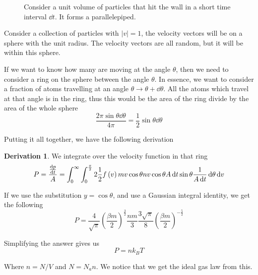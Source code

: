 \documentclass[12pt,chapterprefix=false,dvipsnames]{scrbook}
\theoremstyle{dotless}
\theoremstyle{definition}
\newtheorem{protoderivation}{Derivation}[section]
\newenvironment{derivation}
{\colorlet{shadecolor}{purple!15}\begin{shaded}\begin{protoderivation}}
			{\end{protoderivation}\end{shaded}}
\begin{document}
\begin{figure}[htpb]
	\centering
	
	\caption{Consider a unit volume of particles that hit the wall in a short
		time interval $\dd{t}$. It forms a parallelepiped.}%
	\label{fig:pressure_distribution}
\end{figure}

Consider a collection of particles with $\left|v\right| = 1$,
the velocity vectors will be on a sphere with the unit radius.
The velocity vectors are all random, but it will be within this
sphere.

If we want to know how many are moving at the angle
$\theta$, then we need to consider a ring on the
sphere between the angle $\theta$. In essence, we
want to consider a fraction of atoms travelling at an angle
$\theta \rightarrow \theta +\dd{\theta}$. All the atoms which travel at that
angle is in the ring, thus this would be the area of the ring
divide by the area of the whole sphere
\begin{equation}
	\frac{2\pi\sin{\theta}\dd{\theta}}{4\pi}
	=
	\frac{1}{2}\sin{\theta}\dd{\theta}
\end{equation}

Putting it all together, we have the following derivation

\begin{derivation}
	We integrate over the velocity function in that ring
	\begin{equation}
		P = \frac{\dv{p}{t}}{A} =
		\int_0^\infty\int_0^{\frac{\pi}{2}}2\frac{1}{2}
		f\left(v\right) mv\cos{\theta}
		nv\cos{\theta} A
		\dd{t}\sin{\theta}
		\frac{1}{A \dd{t}}
		\dd{\theta}\dd{v}
	\end{equation}

	If we use the substitution $y = \cos{\theta}$, and use a
	Gaussian integral identity, we get the following
	\begin{equation}
		P = \frac{4}{\sqrt{\pi}} {\left(\frac{\beta m}{2}\right)}^{\frac{3}{2}} \frac{nm}{3}
		\frac{3\sqrt{\pi}}{8} {\left(\frac{\beta m}{2}\right)}^{-\frac{5}{2}}
	\end{equation}

	Simplifying the answer gives us
	\begin{equation}
		P = nk_B T
	\end{equation}

	Where $n = N/V$ and $N = N_a n$. We
	notice that we get the ideal gas law from this.
\end{derivation}
\end{document}
